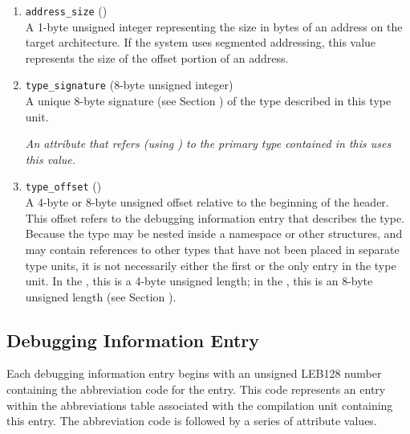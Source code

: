 \begin{enumerate}[1. ]
\item \texttt{address\_size} (\HFTubyte) \\
A 1-byte unsigned integer representing the size 
in bytes of
an address on the target architecture. If the system uses
segmented addressing, this value represents the size of the
offset portion of an address.

\item \texttt{type\_signature} (8-byte unsigned integer) \\
A unique 8-byte signature (see Section 
)
of the type described in this type
unit.  

\textit{An attribute that refers (using 
\DWFORMrefsigeight{}) to
the primary type contained in this 
 uses this value.}

\item \texttt{type\_offset} () \\
A 4-byte or 8-byte unsigned offset 
relative to the beginning
of the  header.
This offset refers to the debugging
information entry that describes the type. Because the type
may be nested inside a namespace or other structures, and may
contain references to other types that have not been placed in
separate type units, it is not necessarily either the first or
the only entry in the type unit. In the \thirtytwobitdwarfformat,
this is a 4-byte unsigned length; in the \sixtyfourbitdwarfformat,
this is an 8-byte unsigned length
(see Section ).

\end{enumerate}

\subsection{Debugging Information Entry}
\label{datarep:debugginginformationentry}

Each debugging information entry begins with an 
unsigned LEB128
number containing the abbreviation code for the entry. This
code represents an entry within the abbreviations table
associated with the compilation unit containing this entry. The
abbreviation code is followed by a series of attribute values.

